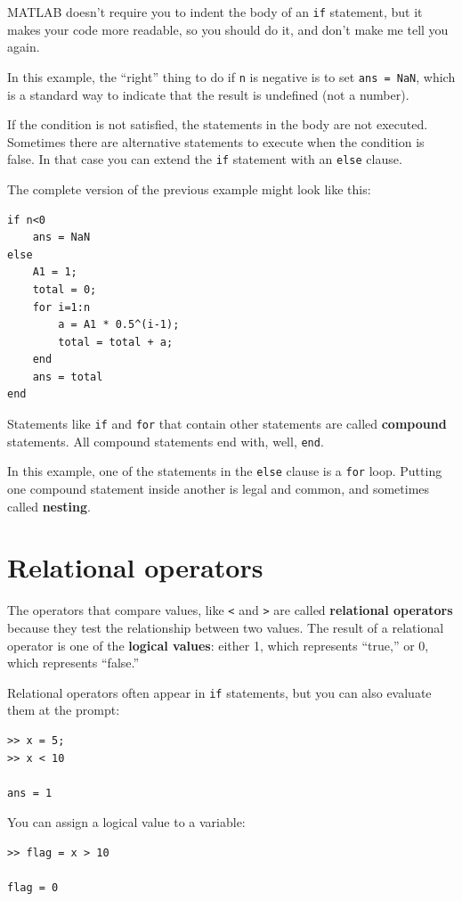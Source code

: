\documentclass{book}
\begin{document}
MATLAB doesn't require you to indent the body of an {\tt if}
statement, but it makes your code more readable, so you should do it,
and don't make me tell you again.

In this example, the ``right'' thing to do if {\tt n} is negative
is to set {\tt ans = NaN}, which is a standard way to indicate that
the result is undefined (not a number).

If the condition is not satisfied, the statements in the body are
not executed.  Sometimes there are alternative statements to
execute when the condition is false.  In that case you can extend
the {\tt if} statement with an {\tt else} clause.

The complete version of the previous example might look like this:

\begin{verbatim}
if n<0
    ans = NaN
else
    A1 = 1;
    total = 0;
    for i=1:n
        a = A1 * 0.5^(i-1);
        total = total + a;
    end
    ans = total
end
\end{verbatim}

Statements like {\tt if} and {\tt for} that contain other statements
are called {\bf compound} statements.  All compound statements end
with, well, {\tt end}.

In this example, one of the statements in the {\tt else} clause is a
{\tt for} loop.  Putting one compound statement inside another is
legal and common, and sometimes called {\bf nesting}.


\section{Relational operators}

The operators that compare values, like {\tt <} and {\tt >} are
called {\bf relational operators} because they test the relationship
between two values.  The result of a relational operator is one
of the {\bf logical values}:
either 1, which represents ``true,''  or 0, which represents ``false.''

Relational operators often appear in {\tt if} statements, but you
can also evaluate them at the prompt:

\begin{verbatim}
>> x = 5;
>> x < 10

ans = 1
\end{verbatim}

You can assign a logical value to a variable:

\begin{verbatim}
>> flag = x > 10

flag = 0
\end{verbatim}
\end{document}
